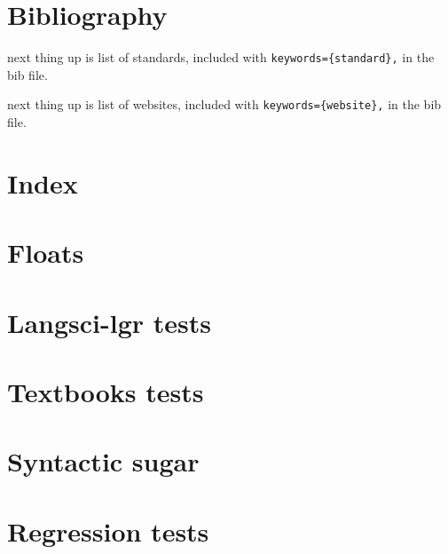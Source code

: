 \documentclass[output=book
  ,colorlinks
  ,showindex
  ]{langscibook}
\begin{document}
\section{Bibliography}


\printbibliography[notkeyword={techreport},notkeyword={website},title={References}]

next thing up is list of standards, included with \verb+keywords={standard},+ in the bib file.

\printbibliography[keyword={standard},title={Standards}]



next thing up is list of websites, included with \verb+keywords={website},+ in the bib file.

\printbibliography[keyword={website},title={Websites}]



\section{Index}


% 

\section{Floats}

% 


%
\section{Langsci-lgr tests}


\section{Textbooks tests}


\section{Syntactic sugar}

\section{Regression tests}


\end{document}
